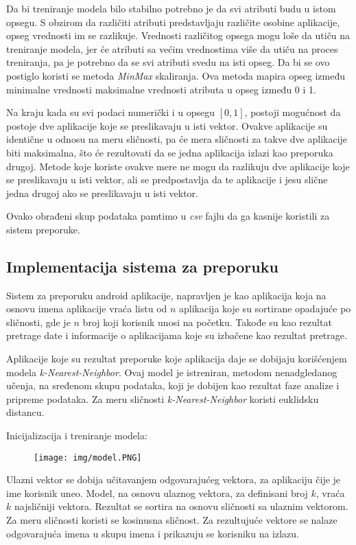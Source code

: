 \documentclass[a4paper,12pt,titlepage]{article}
\begin{document}
Da bi treniranje modela bilo stabilno potrebno je da svi atributi budu u istom opsegu. S obzirom da različiti atributi predstavljaju različite osobine aplikacije, opseg vrednosti im se razlikuje. Vrednosti različitog opsega mogu loše da utiču na treniranje modela, jer će atributi sa većim vrednostima više da utiču na proces treniranja, pa je potrebno da se svi atributi svedu na isti opseg. Da bi se ovo postiglo koristi se metoda \emph{MinMax} skaliranja. Ova metoda mapira opseg između minimalne vrednosti maksimalne vrednosti atributa u opseg između 0 i 1.

Na kraju kada su svi podaci numerički i u opsegu $[0, 1]$, postoji mogućnost da postoje dve aplikacije koje se preslikavaju u isti vektor. Ovakve aplikacije su identične u odnosu na meru sličnosti, pa će mera sličnosti za takve dve aplikacije biti maksimalna, što će rezultovati da se jedna aplikacija izlazi kao preporuka drugoj. Metode koje koriste ovakve mere ne mogu da razlikuju dve aplikacije koje se preslikavaju u isti vektor, ali se predpostavlja da te aplikacije i jesu slične jedna drugoj ako se preslikavaju u isti vektor. 

Ovako obrađeni skup podataka pamtimo u \emph{csv} fajlu da ga kasnije koristili za sistem preporuke. 


\subsection{Implementacija sistema za preporuku}

Sistem za preporuku android aplikacije, napravljen je kao aplikacija koja na osnovu imena aplikacije vraća listu od $n$ aplikacija koje su sortirane opadajuće po sličnosti, gde je $n$ broj koji korisnik unosi na početku. Takođe su kao rezultat pretrage date i informacije o aplikacijama koje su izbačene kao rezultat pretrage. 

Aplikacije koje su rezultat preporuke koje aplikacija daje se dobijaju korišćenjem modela \emph{k-Nearest-Neighbor}. Ovaj model je istreniran, metodom nenadgledanog učenja, na sređenom skupu podataka, koji je dobijen kao rezultat faze analize i pripreme podataka. Za meru sličnosti \emph{k-Nearest-Neighbor} koristi euklidsku distancu.  

Inicijalizacija i treniranje modela:
\begin{figure}[ht!]
\centering
\texttt{[image: img/model.PNG]}
\label{ModelCode}
\end{figure}

Ulazni vektor se dobija učitavanjem odgovarajućeg vektora, za aplikaciju čije je ime korisnik uneo. Model, na osnovu ulaznog vektora, za definisani broj $k$, vraća $k$ najsličniji vektora. Rezultat se sortira na osnovu sličnosti sa ulaznim vektorom. Za meru sličnosti koristi se kosinusna sličnost. Za rezultujuće vektore se nalaze odgovarajuća imena u skupu imena i prikazuju se korisniku na izlazu. 
\end{document}

